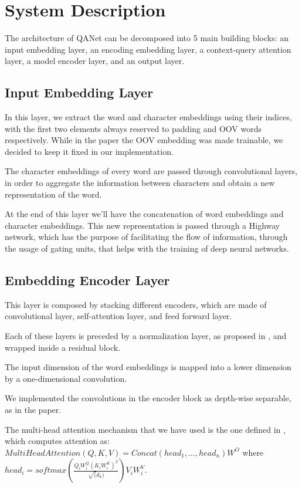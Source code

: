 \chapter{System Description} 
    The architecture of QANet can be decomposed into 5 main building blocks: an input embedding layer, 
    an encoding embedding layer, a context-query attention layer, a model encoder layer, and an output layer.

    \section{Input Embedding Layer}
        In this layer, we extract the word and character embeddings using their indices, with the first two elements always 
        reserved to padding and OOV words respectively.
        While in the paper the OOV embedding was made trainable, we decided to keep it fixed in our implementation.

        The character embeddings of every word are passed through convolutional layers, in order to aggregate the 
        information between characters and obtain a new representation of the word. 
        
        At the end of this layer we'll have the concatenation of word embeddings and character embeddings. 
        This new representation is passed through a Highway network\cite{srivastava2015highway}, which has the purpose of facilitating the 
        flow of information, through the usage of gating units, that helps with the training of deep neural networks.
    
    \section{Embedding Encoder Layer}
        This layer is composed by stacking different encoders, which are made of convolutional layer, self-attention layer, 
        and feed forward layer. 
        
        Each of these layers is preceded by a normalization layer, as proposed in \cite{ba2016layer}, and wrapped inside 
        a residual block. 
        
        The input dimension of the word embeddings is mapped into a lower dimension by a one-dimensional convolution.

        We implemented the convolutions in the encoder block as depth-wise separable, as in the paper. 
        
        The multi-head attention mechanism that we have used is the one defined in \cite{vaswani2017attention}, which computes attention as:
        $MultiHeadAttention(Q,K,V) = Concat(head_{1},...,head_{n}) W^{O}$ where $head_{i} = softmax(\frac{Q_{i}W_{i}^{Q} (K_{i}W_{i}^{K})^{T}}{\sqrt(d_{k})}) V_{i} W_{i}^{V}$.
        
